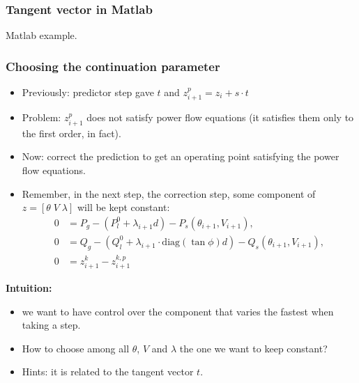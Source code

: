\documentclass{beamer}
\begin{document}
\begin{frame}
  \frametitle{Tangent vector in Matlab}
  Matlab example.
\end{frame}

\begin{frame}
  \frametitle{Choosing the continuation parameter}
  \begin{itemize}
  \item Previously: predictor step gave $t$ and $z_{i+1}^p = z_i + s \cdot t$
  \item Problem: $z_{i+1}^p$ does not satisfy power flow equations (it satisfies them only to the first order, in fact).
  \item Now: correct the prediction to get an operating point satisfying the power flow equations.
\item Remember, in the next step, the correction step, some component of $z=[\theta \; V \; \lambda]$ will be kept constant:
\begin{align}
      0 &= P_g - (P_l^0 + \lambda_{i+1} d) - P_s(\theta_{i+1},V_{i+1}),\\
      0 &= Q_g - (Q_l^0 + \lambda_{i+1} \cdot \text{diag}(\tan \phi) d)- Q_s(\theta_{i+1},V_{i+1}), \\
      0 &= z_{i+1}^{k}-z_{i+1}^{k,p} \label{eq:corr-param}
\end{align}
  \end{itemize}
\textbf{Intuition:}
\begin{itemize}
\item we want to have control over the component that varies the fastest when taking a step.
\item How to choose among all $\theta$, $V$ and $\lambda$ the one we want to keep constant?
\item Hints: it is related to the tangent vector $t$.
\end{itemize}
\end{frame}
\end{document}
